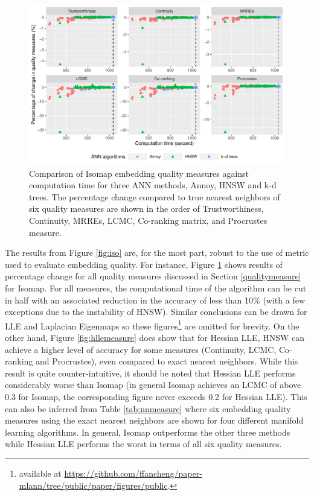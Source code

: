\documentclass[11pt,a4paper,]{article}
\begin{document}
\begin{figure}

{\centering \includegraphics[width=1\linewidth]{mlann_ebs_files/figure-latex/iso6measure-1} 

}

\caption{Comparison of Isomap embedding quality measures against computation time for three ANN methods, Annoy, HNSW and k-d trees. The percentage change compared to true nearest neighbors of six quality measures are shown in the order of Trustworthiness, Continuity, MRREs, LCMC, Co-ranking matrix, and Procrustes measure. }\label{fig:iso6measure}
\end{figure}

The results from Figure \ref{fig:iso} are, for the most part, robust to the use of metric used to evaluate embedding quality. For instance, Figure \ref{fig:iso6measure} shows results of percentage change for all quality measures discussed in Section \ref{qualitymeasure} for Isomap. For all measures, the computational time of the algorithm can be cut in half with an associated reduction in the accuracy of less than 10\% (with a few exceptions due to the instability of HNSW). Similar conclusions can be drawn for LLE and Laplacian Eigenmaps so these figures\footnote{available at \url{https://github.com/ffancheng/paper-mlann/tree/public/paper/figures/public}.} are omitted for brevity.
On the other hand, Figure \ref{fig:hllemeasure} does show that for Hessian LLE, HNSW can achieve a higher level of accuracy for some measures (Continuity, LCMC, Co-ranking and Procrustes), even compared to exact nearest neighbors. While this result is quite counter-intuitive, it should be noted that Hessian LLE performs considerably worse than Isomap (in general Isomap achieves an LCMC of above 0.3 for Isomap, the corresponding figure never exceeds 0.2 for Hessian LLE).
This can also be inferred from Table \ref{tab:nnmeasure} where six embedding quality measures using the exact nearest neighbors are shown for four different manifold learning algorithms. In general, Isomap outperforms the other three methods while Hessian LLE performs the worst in terms of all six quality measures.
\end{document}
